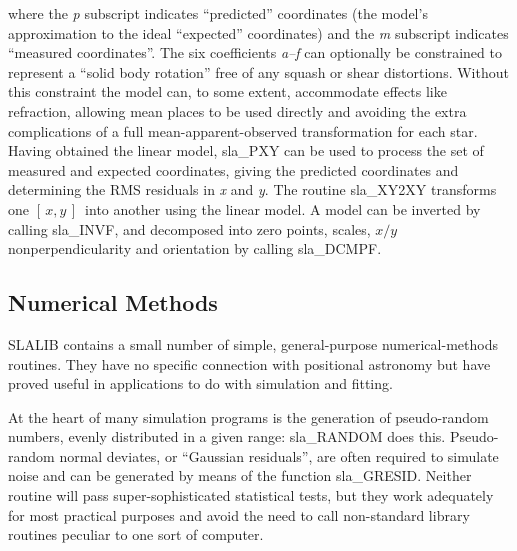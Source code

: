 \documentclass[11pt,twoside]{article}
\newcommand{\xy}        {$[\,x,y\,]$}
\begin{document}
where the {\it p}\/ subscript indicates ``predicted'' coordinates
(the model's approximation to the ideal ``expected'' coordinates) and the
{\it m}\/ subscript indicates ``measured coordinates''.  The
six coefficients {\it a--f}\/ can optionally be
constrained to represent a ``solid body rotation'' free of
any squash or shear distortions.  Without this constraint
the model can, to some extent, accommodate effects like refraction,
allowing mean places to be used directly and
avoiding the extra complications of a
full mean-apparent-observed transformation for each star.
Having obtained the linear model,
sla\_PXY
can be used to process the set of measured and expected
coordinates, giving the predicted coordinates and determining
the RMS residuals in {\it x}\/ and {\it y}.
The routine
sla\_XY2XY
transforms one \xy\ into another using the linear model.  A model
can be inverted by calling
sla\_INVF,
and decomposed into zero points, scales, $x/y$ nonperpendicularity
and orientation by calling
sla\_DCMPF.

\subsection{Numerical Methods}
SLALIB contains a small number of simple, general-purpose
numerical-methods routines.  They have no specific
connection with positional astronomy but have proved useful in
applications to do with simulation and fitting.

At the heart of many simulation programs is the generation of
pseudo-random numbers, evenly distributed in a given range:
sla\_RANDOM
does this.  Pseudo-random normal deviates, or ``Gaussian
residuals'', are often required to simulate noise and
can be generated by means of the function
sla\_GRESID.
Neither routine will pass super-sophisticated
statistical tests, but they work adequately for most
practical purposes and avoid the need to call non-standard
library routines peculiar to one sort of computer.
\end{document}
